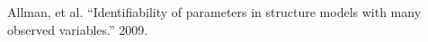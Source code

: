 \documentclass[preview]{standalone}
\begin{document}
\begin{center}
Allman, et al. ``Identifiability of parameters in structure models with many observed variables.'' 2009.
\end{center}
\end{document}

